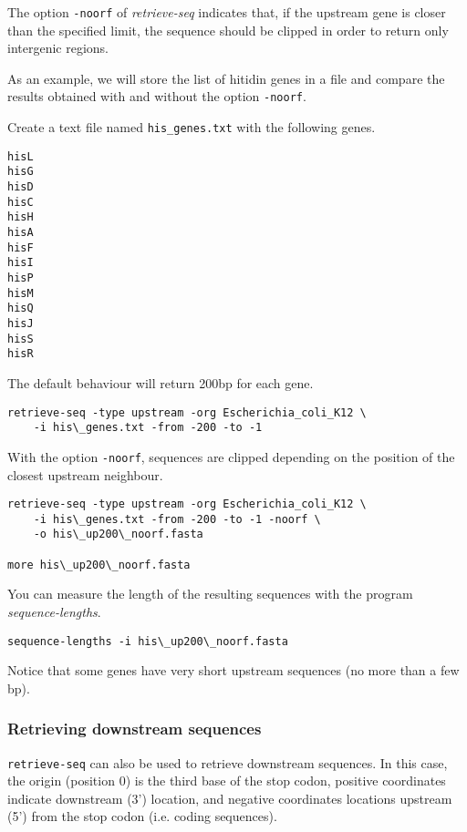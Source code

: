 The option \texttt{-noorf} of \textit{retrieve-seq} indicates that, if
the upstream gene is closer than the specified limit, the sequence
should be clipped in order to return only intergenic regions.

As an example, we will store the list of hitidin genes in a file and
compare the results obtained with and without the option
\texttt{-noorf}.

Create a text file named \texttt{his\_genes.txt} with the following
genes.

\begin{verbatim}
hisL
hisG
hisD
hisC
hisH
hisA
hisF
hisI
hisP
hisM
hisQ
hisJ
hisS
hisR
\end{verbatim}

The default behaviour will return 200bp for each gene. 

\begin{verbatim}
retrieve-seq -type upstream -org Escherichia_coli_K12 \
    -i his\_genes.txt -from -200 -to -1
\end{verbatim}

With the option \texttt{-noorf}, sequences are clipped depending on
the position of the closest upstream neighbour.

\begin{verbatim}
retrieve-seq -type upstream -org Escherichia_coli_K12 \
    -i his\_genes.txt -from -200 -to -1 -noorf \
    -o his\_up200\_noorf.fasta

more his\_up200\_noorf.fasta
\end{verbatim}

You can measure the length of the resulting sequences with the program
\textit{sequence-lengths}.

\begin{verbatim}
sequence-lengths -i his\_up200\_noorf.fasta
\end{verbatim}

Notice that some genes have very short upstream sequences (no more
than a few bp).

\subsubsection{Retrieving downstream sequences}

\texttt{retrieve-seq} can also be used to retrieve downstream
sequences. In this case, the origin (position 0) is the third base of
the stop codon, positive coordinates indicate downstream (3')
location, and negative coordinates locations upstream (5') from the
stop codon (i.e. coding sequences). 

